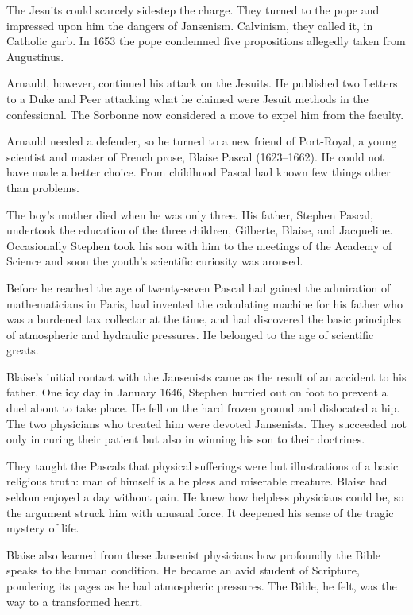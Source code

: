 The Jesuits could scarcely sidestep the charge. They turned to the pope and impressed upon him the
dangers of Jansenism. Calvinism, they called it, in Catholic garb. In 1653 the pope condemned five
propositions allegedly taken from Augustinus.

Arnauld, however, continued his attack on the Jesuits. He published two Letters to a Duke and Peer
attacking what he claimed were Jesuit methods in the confessional. The Sorbonne now considered a
move to expel him from the faculty.

Arnauld needed a defender, so he turned to a new friend of Port-Royal, a young scientist and master
of French prose, Blaise Pascal (1623–1662). He could not have made a better choice. From childhood
Pascal had known few things other than problems.

The boy’s mother died when he was only three. His father, Stephen Pascal, undertook the education of
the three children, Gilberte, Blaise, and Jacqueline. Occasionally Stephen took his son with him to
the meetings of the Academy of Science and soon the youth’s scientific curiosity was aroused.

Before he reached the age of twenty-seven Pascal had gained the admiration of mathematicians in
Paris, had invented the calculating machine for his father who was a burdened tax collector at the
time, and had discovered the basic principles of atmospheric and hydraulic pressures. He belonged to
the age of scientific greats.

Blaise’s initial contact with the Jansenists came as the result of an accident to his father. One
icy day in January 1646, Stephen hurried out on foot to prevent a duel about to take place. He fell
on the hard frozen ground and dislocated a hip. The two physicians who treated him were devoted
Jansenists. They succeeded not only in curing their patient but also in winning his son to their
doctrines.

They taught the Pascals that physical sufferings were but illustrations of a basic religious truth:
man of himself is a helpless and miserable creature. Blaise had seldom enjoyed a day without pain.
He knew how helpless physicians could be, so the argument struck him with unusual force. It deepened
his sense of the tragic mystery of life.

Blaise also learned from these Jansenist physicians how profoundly the Bible speaks to the human
condition. He became an avid student of Scripture, pondering its pages as he had atmospheric
pressures. The Bible, he felt, was the way to a transformed heart.

